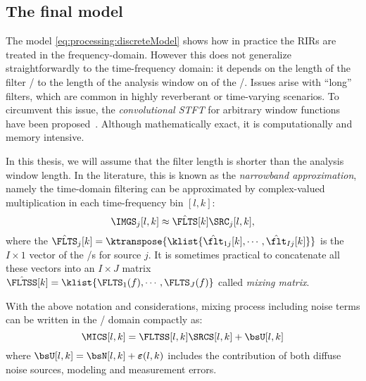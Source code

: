 \begin{figure}[t]
    \begin{fullwidth}
    \centering
        
    \end{fullwidth}
\end{figure}


\subsection{The final model}
The model \eqref{eq:processing:discreteModel} shows how in practice the RIRs are treated in the frequency-domain.
However this does not generalize straightforwardly to the time-frequency domain:
it depends on the length of the filter \wrt/ to the length of the analysis window on of the \STFT/.
Issues arise with ``long'' filters, which are common in highly reverberant or time-varying scenarios.
To circumvent this issue, the \textit{convolutional STFT} for arbitrary window functions have been proposed~.
Although mathematically exact, it is computationally and memory intensive.

In this thesis, we will assume that the filter length is shorter than the analysis window length.
In the literature, this is known as the \textit{narrowband approximation}, namely the time-domain filtering can be approximated by complex-valued multiplication in each time-frequency bin $[l,k]$:
\begin{equation}
    \IMGS_j[l,k] \approx \hat{\FLTS}[k] \SRC_j[l,k]
    ,
\end{equation}
where the $\hat{\FLTS}_j[k] = \ktranspose{\klist{\hat{\flt}_{1j}[k], \cdots, \hat{\flt}_{Ij}[k]}}$ is the $I \times 1$ vector of the \RTF/s for source $j$.
It is sometimes practical to concatenate all these vectors into an $I \times J$ matrix $\hat{\FLTSS}[k] = \klist{\FLTS_1(f),\cdots,\FLTS_J(f)}$ called \textit{mixing matrix}.

With the above notation and considerations, mixing process including noise terms can be written in the \STFT/ domain compactly as:
\begin{equation}\label{eq:processing:model:stfs}
    \MICS[l,k] = \FLTSS[l,k] \SRCS[l,k] + \bsU[l,k]
\end{equation}
where $\bsU[l,k] = \bsN[l,k] + \boldsymbol{\varepsilon}(l,k)$ includes the contribution of both diffuse noise sources, modeling and measurement errors.

